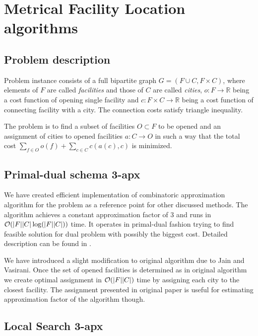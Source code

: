 \chapter{Metrical Facility Location algorithms}

\section{Problem description}

Problem instance consists of a full bipartite graph $G = (F \cup C, F \times
C)$, where elements of $F$ are called \emph{facilities} and those of $C$ are
called \emph{cities}, $o : F \to \mathbb{R}$ being a cost function of opening
single facility and $c : F \times C \to \mathbb{R}$ being a cost function of
connecting facility with a city. The connection costs satisfy triangle
inequality.

The problem is to find a subset of facilities $O \subset F$ to be opened and an
assignment of cities to opened facilities $a : C \to O$ in such a way that the
total cost $\sum_{f \in O} o(f) + \sum_{c \in C} c(a(c), c)$ is minimized.

\section{Primal-dual schema 3-apx}
We have created efficient implementation of combinatoric approximation
algorithm for the problem as a reference point for other discussed methods. The
algorithm achieves a constant approximation factor of 3 and runs in $\mathcal{O}(|F||C|
\log(|F||C|))$ time. It operates in primal-dual fashion trying to find feasible
solution for dual problem with possibly the biggest cost. Detailed description
can be found in \cite{Vazirani}.

We have introduced a slight modification to original algorithm due to Jain and
Vasirani. Once the set of opened facilities is determined as in original
algorithm we create optimal assignment in $\mathcal{O}(|F||C|)$ time by assigning each
city to the closest facility. The assignment presented in original paper is
useful for estimating approximation factor of the algorithm though.

\section{Local Search 3-apx}

